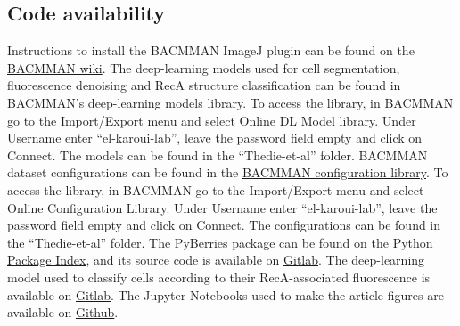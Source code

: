 \subsection*{Code availability}
Instructions to install the BACMMAN ImageJ plugin can be found on the \href{https://github.com/jeanollion/bacmman/wiki/Installation}{BACMMAN wiki}. The deep-learning models used for cell segmentation, fluorescence denoising and RecA structure classification can be found in BACMMAN's deep-learning models library. To access the library, in BACMMAN go to the Import/Export menu and select Online DL Model library. Under Username enter ``el-karoui-lab'', leave the password field empty and click on Connect. The models can be found in the ``Thedie-et-al'' folder. BACMMAN dataset configurations can be found in the \href{https://github.com/jeanollion/bacmman/wiki/Online-Configuration-Library}{BACMMAN configuration library}. To access the library, in BACMMAN go to the Import/Export menu and select Online Configuration Library. Under Username enter ``el-karoui-lab'', leave the password field empty and click on Connect. The configurations can be found in the ``Thedie-et-al'' folder. The PyBerries package can be found on the \href{https://pypi.org/project/PyBerries/}{Python Package Index}, and its source code is available on \href{https://gitlab.com/MEKlab/pyberries}{Gitlab}. The deep-learning model used to classify cells according to their RecA-associated fluorescence is available on \href{https://gitlab.com/MEKlab/bacmman-object-classifier}{Gitlab}. The Jupyter Notebooks used to make the article figures are available on \href{https://github.com/DanielThedie/RecB_article}{Github}.
